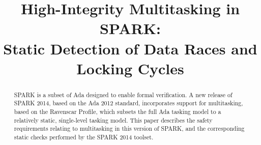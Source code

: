 \documentclass[conference,compsoc]{IEEEtran}
\begin{document}
\title{High-Integrity Multitasking in SPARK:\\
  Static Detection of Data Races and Locking Cycles}

\author{
\and
{}
\and
{}
}

\maketitle

%
%

\begin{abstract}
  SPARK is a subset of Ada designed to enable formal verification. A new
  release of SPARK 2014, based on the Ada 2012 standard, incorporates
  support for multitasking, based on the Ravenscar Profile, which subsets
  the full Ada tasking model to a relatively static, single-level tasking
  model. This paper describes the safety requirements relating to
  multitasking in this version of SPARK, and the corresponding static
  checks performed by the SPARK 2014 toolset.
\end{abstract}


%







\end{document}
